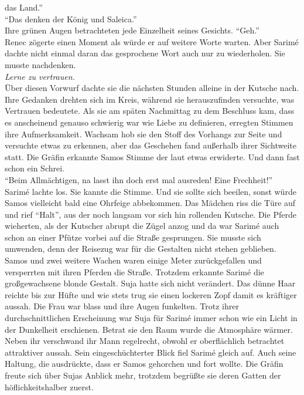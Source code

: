 das Land.''\\
``Das denken der König und Saleica.''\\
Ihre grünen Augen betrachteten jede Einzelheit seines Gesichts. ``Geh.'' \\
Renec zögerte einen Moment als würde er auf weitere Worte warten. Aber Sarimé dachte nicht einmal 
daran das gesprochene Wort auch nur zu wiederholen. Sie musste nachdenken.\\
\textit{Lerne zu vertrauen.}\\
Über diesen Vorwurf dachte sie die nächsten Stunden alleine in der Kutsche nach. Ihre Gedanken 
drehten sich im Kreis, während sie herauszufinden versuchte, was Vertrauen bedeutete. Als sie am 
späten Nachmittag zu dem Beschluss kam, dass es anscheinend genauso schwierig war wie Liebe zu 
definieren, erregten Stimmen ihre Aufmerksamkeit. Wachsam hob sie den Stoff des Vorhangs zur Seite 
und versuchte etwas zu erkennen, aber das Geschehen fand außerhalb ihrer Sichtweite statt. Die 
Gräfin erkannte Samos Stimme der laut etwas erwiderte. Und dann fast schon ein Schrei.\\
``Beim Allmächtigen, na lasst ihn doch erst mal ausreden! Eine Frechheit!''\\
Sarimé lachte los. Sie kannte die Stimme. Und sie sollte sich beeilen, sonst würde Samos vielleicht 
bald eine Ohrfeige abbekommen. Das Mädchen riss die Türe auf und rief ``Halt'', aus der noch 
langsam 
vor sich hin rollenden Kutsche. Die Pferde wieherten, als der Kutscher abrupt die Zügel anzog und 
da 
war Sarimé auch schon an einer Pfütze vorbei auf die Straße gesprungen. Sie musste sich umwenden, 
denn der Reisezug war für die Gestalten nicht stehen geblieben. Samos und zwei weitere Wachen waren 
einige Meter zurückgefallen und versperrten mit ihren Pferden die Straße. Trotzdem erkannte Sarimé 
die großgewachsene blonde Gestalt. Suja hatte sich nicht verändert. Das dünne Haar reichte bis zur 
Hüfte und wie stets trug sie einen lockeren Zopf damit es kräftiger aussah. Die Frau war blass und 
ihre Augen funkelten. Trotz ihrer durchschnittlichen Erscheinung war Suja für Sarimé immer schon 
wie 
ein Licht in der Dunkelheit erschienen. Betrat sie den Raum wurde die Atmosphäre wärmer. Neben ihr 
verschwand ihr Mann regelrecht, obwohl er oberflächlich betrachtet attraktiver aussah. Sein 
eingeschüchterter Blick fiel Sarimé gleich auf. Auch seine Haltung, die ausdrückte, dass er Samos 
gehorchen und fort wollte. Die Gräfin freute sich über Sujas Anblick mehr, trotzdem begrüßte sie 
deren Gatten der höflichkeitshalber zuerst. \\
